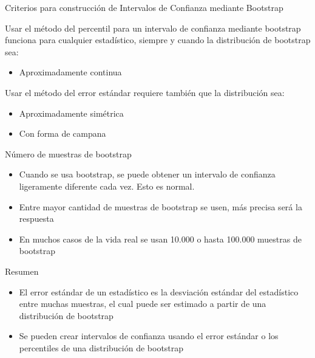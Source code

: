 \documentclass[11pt, aspectratio=169]{beamer}
\begin{document}
\begin{frame}
{Criterios para construcción de Intervalos de Confianza mediante Bootstrap}{}
 \Large

 Usar el método del percentil para un intervalo de confianza mediante
 bootstrap funciona para cualquier estadístico, siempre y cuando la
 distribución de bootstrap sea:

 \begin{itemize}
  \item Aproximadamente continua
 \end{itemize}

 \vspace{1em}
 Usar el método del error estándar requiere también que la distribución sea:

 \begin{itemize}
  \item Aproximadamente simétrica
  \item Con forma de campana
 \end{itemize}
\end{frame}

\begin{frame}
{Número de muestras de bootstrap}{}
 \centering \large

 \begin{itemize} \itemsep 1em
 \item Cuando se usa bootstrap, se puede obtener un intervalo de confianza
 ligeramente diferente cada vez. Esto es normal.

 \item Entre mayor cantidad de muestras de bootstrap se usen, más precisa
 será la respuesta

 \item En muchos casos de la vida real se usan 10.000 o hasta 100.000
 muestras de bootstrap
 \end{itemize}
\end{frame}

\begin{frame}
{Resumen}{}
 \centering \large

 \begin{itemize} \itemsep 1em
 \item El error estándar de un estadístico es la desviación estándar del
 estadístico entre muchas muestras, el cual puede ser estimado a partir de
 una distribución de bootstrap

 \item Se pueden crear intervalos de confianza usando el error estándar o
 los percentiles de una distribución de bootstrap
 \end{itemize}
\end{frame}
\end{document}
